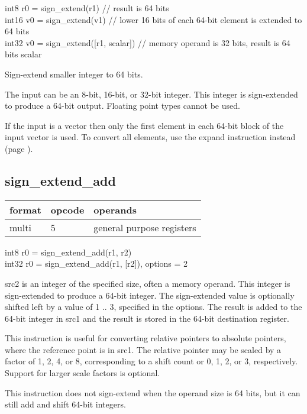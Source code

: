 \documentclass[forwardcom.tex]{subfiles}
\begin{document}
int8 r0 = sign\_extend(r1)  // result is 64 bits\\
int16 v0 = sign\_extend(v1)  // lower 16 bits of each 64-bit element is extended to 64 bits\\
int32 v0 = sign\_extend([r1, scalar]) // memory operand is 32 bits, result is 64 bits scalar
\vv

Sign-extend smaller integer to 64 bits.
\vv

The input can be an 8-bit, 16-bit, or 32-bit integer. This integer is sign-extended to produce a 64-bit output. Floating point types cannot be used.
\vv

If the input is a vector then only the first element in each 64-bit block of the input vector is used. To convert all elements, use the expand instruction instead 
(page \pageref{table:expandInstruction}).
\vv


\subsection{sign\_extend\_add}
\label{table:signExtendAddInstruction}
\begin{tabular}{|p{12mm}|p{15mm}|p{100mm}|}
\hline
\bfseries format & \bfseries opcode & \bfseries operands \\ \hline
multi & 5 & general purpose registers \\ \hline
\end{tabular}
\vv

int8 r0 = sign\_extend\_add(r1, r2) \\ 
int32 r0 = sign\_extend\_add(r1, [r2]), options = 2
\vv

src2 is an integer of the specified size, often a memory operand.
This integer is sign-extended to produce a 64-bit integer. 
The sign-extended value is optionally shifted left by a value of 1 .. 3, specified in the options. 
The result is added to the 64-bit integer in src1 and the result is stored in the 64-bit destination register.
\vv

This instruction is useful for converting relative pointers to absolute pointers, where the reference point is in src1. The relative pointer may be scaled by a factor of 1, 2, 4, or 8, corresponding to a shift count or 0, 1, 2, or 3, respectively. Support for larger scale factors is optional.
\vv

This instruction does not sign-extend when the operand size is 64 bits, but it can still add and shift 64-bit integers.
\vv
\end{document}

